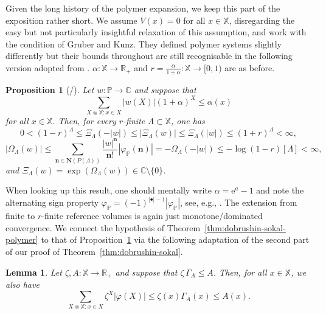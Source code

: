 \documentclass[10pt,a4paper]{amsart}
\newtheorem{lemma}[theorem]{Lemma}
\newtheorem{prop}[theorem]{Proposition}
\newcommand{\e}{\mathrm{e}}
\newcommand{\R}{\mathbb{R}}
\newcommand{\C}{\mathbb{C}}
\renewcommand{\P}{\mathbb{P}}
\newcommand{\X}{\mathbb X}
\begin{document}
Given the long history of the polymer expansion, we keep this part of the exposition rather short. 
We assume $V(x) = 0$ for all $x \in \X$, disregarding the easy but not particularly insightful relaxation of this assumption, and work with the condition of Gruber and Kunz. 
They defined polymer systems slightly differently but their bounds throughout \cite[Subsection~4.2]{ref:gruber-kunz} are still recognisable in the following version adopted from \cite{ref:fernandez-procacci, ref:bissacot-fernandez-procacci, ref:jansen-kolesnikov}. 
$\alpha : \X \to \R_+$ and $r = \frac{\alpha}{1+\alpha} : \X \to [0, 1)$ are as before.

\begin{prop}[{\cite[Theorem~2.4]{ref:bissacot-fernandez-procacci}/\cite[Corollary~2.8]{ref:jansen-kolesnikov}}] \label{prop:gruber-kunz}
	Let $w : \P \to \C$ and suppose that
	\[
		\sum_{X \Subset \X : x \in X} |w(X)| (1 + \alpha)^X \leq \alpha(x)
	\]
	for all $x \in \X$. 
	Then, for every $r$-finite $\Lambda \subset \X$, one has
	\[
		0 < (1-r)^\Lambda \leq \Xi_\Lambda(-|w|) \leq |\Xi_\Lambda(w)| \leq \Xi_\Lambda(|w|) \leq (1+r)^\Lambda < \infty,
	\]
	\[
		|\Omega_\Lambda(w)| \leq \sum_{\mathbf n \in \mathbf N(P(\Lambda))} \frac{|w|^\mathbf n}{\mathbf n!} |\varphi_\P(\mathbf n)| = - \Omega_\Lambda(-|w|) \leq - \log (1 - r)[\Lambda] < \infty,
	\]
	and $\Xi_\Lambda(w) = \exp(\Omega_\Lambda(w)) \in \C \setminus \{0\}$.
\end{prop}

When looking up this result, one should mentally write $\alpha = \e^a - 1$ and note the alternating sign property $\varphi_\P = (-1)^{|\bullet|-1} |\varphi_\P|$, see, e.g., \cite{ref:scott-sokal, ref:fernandez-procacci, ref:bissacot-fernandez-procacci, ref:jansen-kolesnikov}. 
The extension from finite to $r$-finite reference volumes is again just monotone/dominated convergence. 
We connect the hypothesis of Theorem~\ref{thm:dobrushin-sokal-polymer} to that of Proposition~\ref{prop:gruber-kunz} via the following adaptation of the second part of our proof of Theorem~\ref{thm:dobrushin-sokal}.

\begin{lemma} \label{lem:dobrushin-sokal-subsets}
	Let $\zeta, A : \X \to \R_+$ and suppose that $\zeta \, \Gamma_A \leq A$. 
	Then, for all $x \in \X$, we also have
	\[
		\sum_{X \Subset \X : x \in X} \zeta^X |\varphi(X)| \leq \zeta(x) \Gamma_A(x) \leq A(x).
	\]
\end{lemma}
\end{document}
